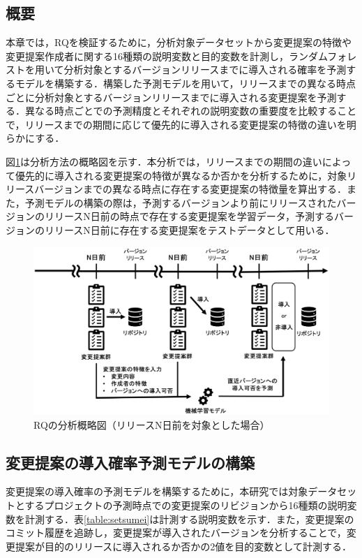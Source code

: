 \documentclass[submit,ses,noauthor]{ipsj}
\begin{document}
\subsection{概要}
本章では，RQを検証するために，分析対象データセットから変更提案の特徴や変更提案作成者に関する16種類の説明変数と目的変数を計測し，ランダムフォレストを用いて分析対象とするバージョンリリースまでに導入される確率を予測するモデルを構築する．構築した予測モデルを用いて，リリースまでの異なる時点ごとに分析対象とするバージョンリリースまでに導入される変更提案を予測する．異なる時点ごとでの予測精度とそれぞれの説明変数の重要度を比較することで，リリースまでの期間に応じて優先的に導入される変更提案の特徴の違いを明らかにする．

図\ref{fig:RQ1_figure}は分析方法の概略図を示す．本分析では，リリースまでの期間の違いによって優先的に導入される変更提案の特徴が異なるか否かを分析するために，対象リリースバージョンまでの異なる時点に存在する変更提案の特徴量を算出する．また，予測モデルの構築の際は，予測するバージョンより前にリリースされたバージョンのリリースN日前の時点で存在する変更提案を学習データ，予測するバージョンのリリースN日前に存在する変更提案をテストデータとして用いる．

\begin{figure}[t]
\begin{center}
\includegraphics[width=1.0\linewidth]{fig/RQ1_figure.eps}
\caption{RQの分析概略図（リリースN日前を対象とした場合）}
\label{fig:RQ1_figure}
\end{center}
\end{figure}

\subsection{変更提案の導入確率予測モデルの構築}\label{model}
変更提案の導入確率の予測モデルを構築するために，本研究では対象データセットとするプロジェクトの予測時点での変更提案のリビジョンから16種類の説明変数を計測する．表\ref{table:setsumei}は計測する説明変数を示す．また，変更提案のコミット履歴を追跡し，変更提案が導入されたバージョンを分析することで，変更提案が目的のリリースに導入されるか否かの2値を目的変数として計測する．
\end{document}
